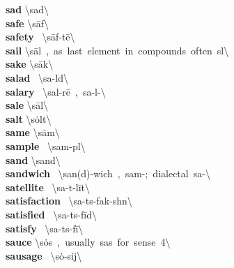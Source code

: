 \documentclass[10pt,a4paper]{article}
\begin{document}
\begin{multicols}{2}
\textbf{ sad }\quad \textbackslash \textprimstress sad\textbackslash \\
\textbf{ safe }\quad \textbackslash \textprimstress s\={a}f\textbackslash \\
\textbf{ safety }\quad \ \textbackslash \textprimstress s\={a}f-t\={e}\textbackslash \\
\textbf{ sail }\quad \textbackslash \textprimstress s\={a}l\ ,\ as\ last\ element\ in\ compounds\ often\ s\textschwa l\textbackslash \\
\textbf{ sake }\quad \textbackslash \textprimstress s\={a}k\textbackslash \\
\textbf{ salad }\quad \ \textbackslash \textprimstress sa-l\textschwa d\textbackslash \\
\textbf{ salary }\quad \ \textbackslash \textprimstress sal-r\={e}\ ,\ \textprimstress sa-l\textschwa -\textbackslash \\
\textbf{ sale }\quad \textbackslash \textprimstress s\={a}l\textbackslash \\
\textbf{ salt }\quad \textbackslash \textprimstress s\.{o}lt\textbackslash \\
\textbf{ same }\quad \textbackslash \textprimstress s\={a}m\textbackslash \\
\textbf{ sample }\quad \ \textbackslash \textprimstress sam-p\textschwa l\textbackslash \\
\textbf{ sand }\quad \textbackslash \textprimstress sand\textbackslash \\
\textbf{ sandwich }\quad \ \textbackslash \textprimstress san(d)-\textsecstress wich\ ,\ \textprimstress sam-;\ dialectal\ \textprimstress sa\engma -\textbackslash \\
\textbf{ satellite }\quad \ \textbackslash \textprimstress sa-t\textschwa -\textsecstress l\={i}t\textbackslash \\
\textbf{ satisfaction }\quad \ \textbackslash \textsecstress sa-t\textschwa s-\textprimstress fak-sh\textschwa n\textbackslash \\
\textbf{ satisfied }\quad \ \textbackslash \textprimstress sa-t\textschwa s-\textsecstress f\={i}d\textbackslash \\
\textbf{ satisfy }\quad \ \textbackslash \textprimstress sa-t\textschwa s-\textsecstress f\={i}\textbackslash \\
\textbf{ sauce }\quad \textbackslash \textprimstress s\.{o}s\ ,\ usually\ \textprimstress sas\ for\ sense\ 4\textbackslash \\
\textbf{ sausage }\quad \ \textbackslash \textprimstress s\.{o}-sij\textbackslash \\

\end{multicols}
\end{document}
